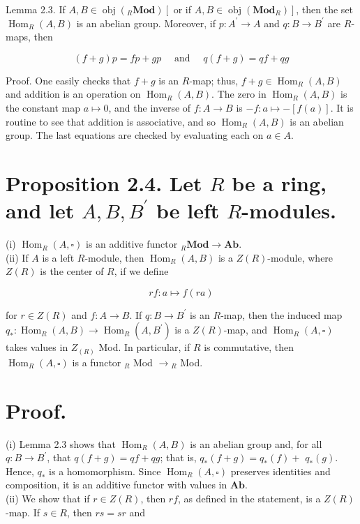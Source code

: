 \documentclass[10pt]{article}
\begin{document}
Lemma 2.3. If $A, B \in \operatorname{obj}\left({ }_{R} \mathbf{M o d}\right)\left[\right.$ or if $\left.A, B \in \operatorname{obj}\left(\mathbf{M o d}_{R}\right)\right]$, then the set $\operatorname{Hom}_{R}(A, B)$ is an abelian group. Moreover, if $p: A^{\prime} \rightarrow A$ and $q: B \rightarrow B^{\prime}$ are $R$-maps, then

$$
(f+g) p=f p+g p \quad \text { and } \quad q(f+g)=q f+q g
$$

Proof. One easily checks that $f+g$ is an $R$-map; thus, $f+g \in \operatorname{Hom}_{R}(A, B)$ and addition is an operation on $\operatorname{Hom}_{R}(A, B)$. The zero in $\operatorname{Hom}_{R}(A, B)$ is the constant map $a \mapsto 0$, and the inverse of $f: A \rightarrow B$ is $-f: a \mapsto-[f(a)]$. It is routine to see that addition is associative, and so $\operatorname{Hom}_{R}(A, B)$ is an abelian group. The last equations are checked by evaluating each on $a \in A$.

\section*{Proposition 2.4. Let $R$ be a ring, and let $A, B, B^{\prime}$ be left $R$-modules.}
(i) $\operatorname{Hom}_{R}(A, \square)$ is an additive functor ${ }_{R} \mathbf{M o d} \rightarrow \mathbf{A b}$.\\
(ii) If $A$ is a left $R$-module, then $\operatorname{Hom}_{R}(A, B)$ is a $Z(R)$-module, where $Z(R)$ is the center of $R$, if we define

$$
r f: a \mapsto f(r a)
$$

for $r \in Z(R)$ and $f: A \rightarrow B$. If $q: B \rightarrow B^{\prime}$ is an $R$-map, then the induced map $q_{*}: \operatorname{Hom}_{R}(A, B) \rightarrow \operatorname{Hom}_{R}\left(A, B^{\prime}\right)$ is a $Z(R)$-map, and $\operatorname{Hom}_{R}(A, \square)$ takes values in $Z_{(R)}$ Mod. In particular, if $R$ is commutative, then $\operatorname{Hom}_{R}(A, \square)$ is a functor ${ }_{R}$ Mod $\rightarrow{ }_{R}$ Mod.

\section*{Proof.}
(i) Lemma 2.3 shows that $\operatorname{Hom}_{R}(A, B)$ is an abelian group and, for all $q: B \rightarrow B^{\prime}$, that $q(f+g)=q f+q g$; that is, $q_{*}(f+g)=q_{*}(f)+$ $q_{*}(g)$. Hence, $q_{*}$ is a homomorphism. Since $\operatorname{Hom}_{R}(A, \square)$ preserves identities and composition, it is an additive functor with values in $\mathbf{A b}$.\\
(ii) We show that if $r \in Z(R)$, then $r f$, as defined in the statement, is a $Z(R)$-map. If $s \in R$, then $r s=s r$ and
\end{document}
